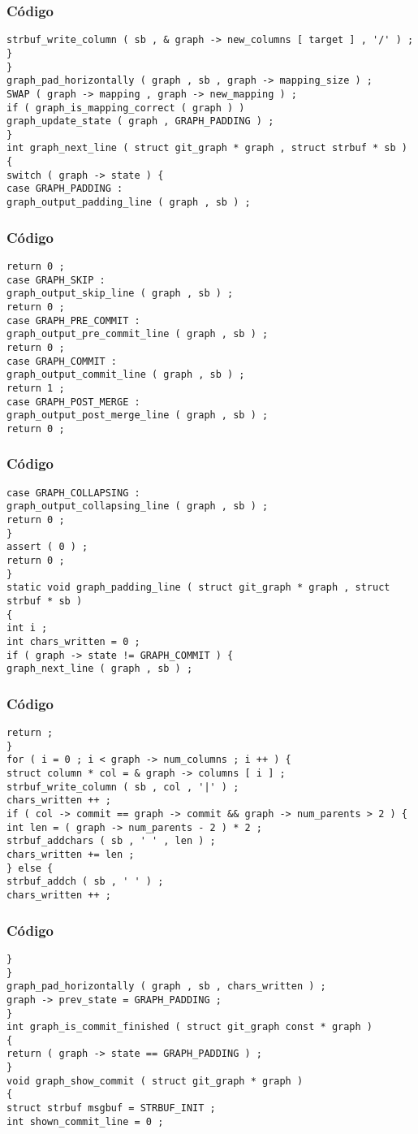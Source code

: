\documentclass{beamer}
\begin{document}
\begin{frame}[fragile]
\frametitle{C\'odigo}
\begin{verbatim}
strbuf_write_column ( sb , & graph -> new_columns [ target ] , '/' ) ; 
} 
} 
graph_pad_horizontally ( graph , sb , graph -> mapping_size ) ; 
SWAP ( graph -> mapping , graph -> new_mapping ) ; 
if ( graph_is_mapping_correct ( graph ) ) 
graph_update_state ( graph , GRAPH_PADDING ) ; 
} 
int graph_next_line ( struct git_graph * graph , struct strbuf * sb ) 
{ 
switch ( graph -> state ) { 
case GRAPH_PADDING : 
graph_output_padding_line ( graph , sb ) ; 
\end{verbatim}
\end{frame}
\begin{frame}[fragile]
\frametitle{C\'odigo}
\begin{verbatim}
return 0 ; 
case GRAPH_SKIP : 
graph_output_skip_line ( graph , sb ) ; 
return 0 ; 
case GRAPH_PRE_COMMIT : 
graph_output_pre_commit_line ( graph , sb ) ; 
return 0 ; 
case GRAPH_COMMIT : 
graph_output_commit_line ( graph , sb ) ; 
return 1 ; 
case GRAPH_POST_MERGE : 
graph_output_post_merge_line ( graph , sb ) ; 
return 0 ; 
\end{verbatim}
\end{frame}
\begin{frame}[fragile]
\frametitle{C\'odigo}
\begin{verbatim}
case GRAPH_COLLAPSING : 
graph_output_collapsing_line ( graph , sb ) ; 
return 0 ; 
} 
assert ( 0 ) ; 
return 0 ; 
} 
static void graph_padding_line ( struct git_graph * graph , struct strbuf * sb ) 
{ 
int i ; 
int chars_written = 0 ; 
if ( graph -> state != GRAPH_COMMIT ) { 
graph_next_line ( graph , sb ) ; 
\end{verbatim}
\end{frame}
\begin{frame}[fragile]
\frametitle{C\'odigo}
\begin{verbatim}
return ; 
} 
for ( i = 0 ; i < graph -> num_columns ; i ++ ) { 
struct column * col = & graph -> columns [ i ] ; 
strbuf_write_column ( sb , col , '|' ) ; 
chars_written ++ ; 
if ( col -> commit == graph -> commit && graph -> num_parents > 2 ) { 
int len = ( graph -> num_parents - 2 ) * 2 ; 
strbuf_addchars ( sb , ' ' , len ) ; 
chars_written += len ; 
} else { 
strbuf_addch ( sb , ' ' ) ; 
chars_written ++ ; 
\end{verbatim}
\end{frame}
\begin{frame}[fragile]
\frametitle{C\'odigo}
\begin{verbatim}
} 
} 
graph_pad_horizontally ( graph , sb , chars_written ) ; 
graph -> prev_state = GRAPH_PADDING ; 
} 
int graph_is_commit_finished ( struct git_graph const * graph ) 
{ 
return ( graph -> state == GRAPH_PADDING ) ; 
} 
void graph_show_commit ( struct git_graph * graph ) 
{ 
struct strbuf msgbuf = STRBUF_INIT ; 
int shown_commit_line = 0 ; 
\end{verbatim}
\end{frame}
\end{document}
